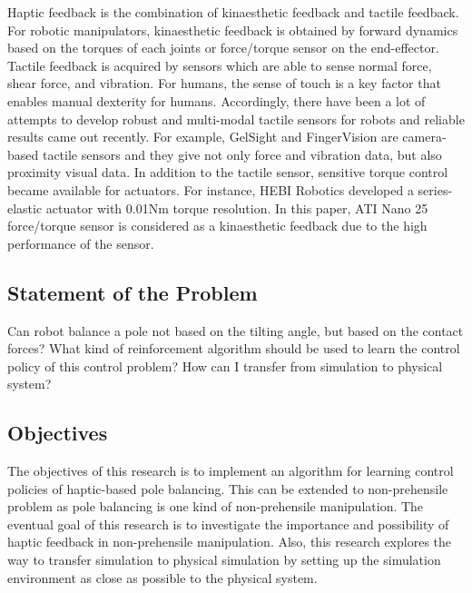 \documentclass{article}
\begin{document}
Haptic feedback is the combination of kinaesthetic feedback and tactile feedback. For robotic manipulators, kinaesthetic feedback is obtained by forward dynamics based on the torques of each joints or force/torque sensor on the end-effector. Tactile feedback is acquired by sensors which are able to sense normal force, shear force, and vibration. For humans, the sense of touch is a key factor that enables manual dexterity for humans. Accordingly, there have been a lot of attempts to develop robust and multi-modal tactile sensors for robots and reliable results came out recently. For example, GelSight and FingerVision are camera-based tactile sensors and they give not only force and vibration data, but also proximity visual data. In addition to the tactile sensor, sensitive torque control became available for actuators. For instance, HEBI Robotics developed a series-elastic actuator with 0.01Nm torque resolution. In this paper, ATI Nano 25 force/torque sensor is considered as a kinaesthetic feedback due to the high performance of the sensor. 

\subsection{Statement of the Problem}

Can robot balance a pole not based on the tilting angle, but based on the contact forces? What kind of reinforcement algorithm should be used to learn the control policy of this control problem? How can I transfer from simulation to physical system?

\subsection{Objectives}

The objectives of this research is to implement an algorithm for learning control policies of haptic-based pole balancing. This can be extended to non-prehensile problem as pole balancing is one kind of non-prehensile manipulation. The eventual goal of this research is to investigate the importance and possibility of haptic feedback in non-prehensile manipulation. Also, this research explores the way to transfer simulation to physical simulation by setting up the simulation environment as close as possible to the physical system.

\end{document}
